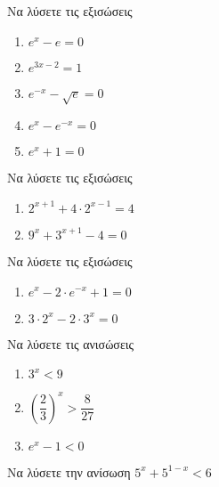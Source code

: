 \documentclass[greek]{beamer}
\begin{document}
\begin{askisi}

  Να λύσετε τις εξισώσεις
  \begin{enumerate}
    \item<1-> $e^x-e=0$
    \item<2-> $e^{3x-2}=1$
    \item<3-> $e^{-x}-\sqrt{e}=0$
    \item<4-> $e^x-e^{-x}=0$
    \item<5-> $e^x+1=0$
  \end{enumerate}


\end{askisi}

\begin{askisi}
  Να λύσετε τις εξισώσεις
  \begin{enumerate}
    \item<1-> $2^{x+1}+4\cdot 2^{x-1}=4$
    \item<2-> $9^x+3^{x+1}-4=0$
  \end{enumerate}


\end{askisi}

\begin{askisi}
  Να λύσετε τις εξισώσεις
  \begin{enumerate}
    \item<1-> $e^x-2\cdot e^{-x}+1=0$
    \item<2-> $3\cdot 2^x-2\cdot 3^x=0$
  \end{enumerate}


\end{askisi}

\begin{askisi}
  Να λύσετε τις ανισώσεις
  \begin{enumerate}
    \item<1-> $3^x<9$
    \item<2-> $\left( \dfrac{2}{3} \right)^x > \dfrac{8}{27} $
    \item<3-> $e^x-1<0$
  \end{enumerate}


\end{askisi}

\begin{askisi}
  Να λύσετε την ανίσωση $5^x+5^{1-x}<6$


\end{askisi}
\end{document}
